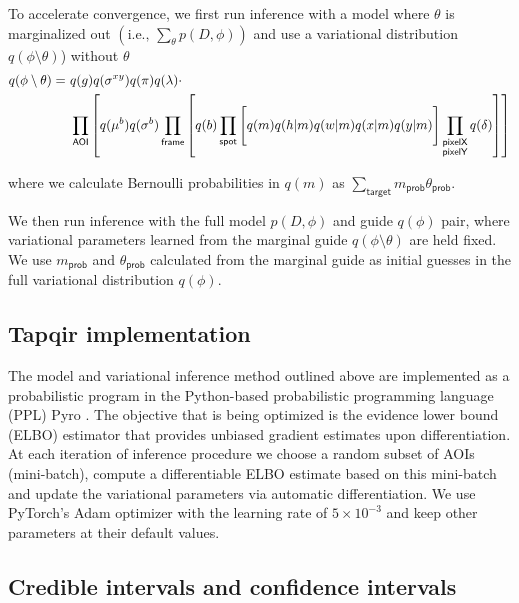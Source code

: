 

To accelerate convergence, we first run inference with a model where $\theta$ is marginalized out $\left(\textrm{i.e., } \sum_\theta p(D, \phi) \right)$ and use a variational distribution $q(\phi \setminus \theta)$) without $\theta$
%
\begin{equation}
\begin{aligned}
    q(\phi \setminus \theta) =~&q(g) q(\sigma^{xy}) q(\pi) q(\lambda) \cdot \\
    &\prod_{\mathsf{AOI}} \left[ q(\mu^b) q(\sigma^b) \prod_{\mathsf{frame}} \left[ \vphantom{\prod_{F}} q(b) \prod_{\mathsf{spot}} \left[ \vphantom{\prod_{F}} q(m) q(h | m) q(w | m) q(x | m) q(y | m) \right] \prod_{\substack{\mathsf{pixelX} \\ \mathsf{pixelY}}} q(\delta) \right] \right]
\end{aligned}
\end{equation}

where we calculate Bernoulli probabilities in $q(m)$ as $\sum_\mathsf{target} m_\mathsf{prob} \theta_\mathsf{prob}$. 

We then run inference with the full model $p(D, \phi)$ and guide $q(\phi)$ pair, where variational parameters learned from the marginal guide $q(\phi \setminus \theta)$ are held fixed.  We use $m_\mathsf{prob}$ and $\theta_\mathsf{prob}$ calculated from the marginal guide as initial guesses in the full variational distribution $q(\phi)$.

\subsection{Tapqir implementation}

The model and variational inference method outlined above are implemented as a probabilistic program in the Python-based probabilistic programming language (PPL) Pyro \citep{Foerster2018-kd,Bingham2019-qy,Obermeyer2019-xt}. The objective that is being optimized is the evidence lower bound (ELBO) estimator that provides unbiased gradient estimates upon differentiation. At each iteration of inference procedure we choose a random subset of AOIs (mini-batch), compute a differentiable ELBO estimate based on this mini-batch and update the variational parameters via automatic differentiation. We use PyTorch's Adam optimizer \citep{Kingma2014-cz} with the learning rate of $5\times 10^{-3}$ and keep other parameters at their default values. 


\subsection{Credible intervals and confidence intervals}

